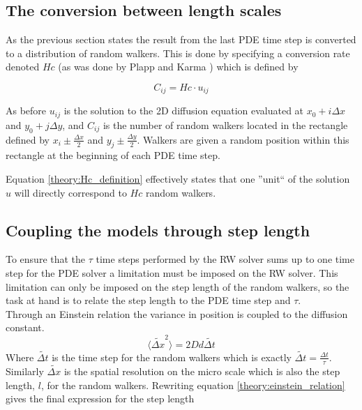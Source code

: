 \subsection{The conversion between length scales}
As the previous section states the result from the last PDE time step is converted to a distribution of random walkers. 
This is done by specifying a conversion rate denoted $Hc$ (as was done by Plapp and Karma \cite{plapp2000multiscale}) which is defined by

\begin{equation}\label{theory:Hc_definition}
 C_{ij} = Hc\cdot u_{ij}
\end{equation}

\noindent As before $u_{ij}$ is the solution to the 2D diffusion equation evaluated at $x_0 +i\Delta x$ and $y_0 +j\Delta y$, and $C_{ij}$ is the number of random walkers located in the rectangle defined by $x_i\pm\frac{\Delta x}{2}$ and $y_j\pm\frac{\Delta y}{2}$. 
Walkers are given a random position within this rectangle at the beginning of each PDE time step. 

Equation \eqref{theory:Hc_definition} effectively states that one ''unit`` of the solution $u$ will directly correspond to $Hc$ random walkers.

\subsection{Coupling the models through step length}

To ensure that the $\tau$ time steps performed by the RW solver sums up to one time step for the PDE solver a limitation must be imposed on the RW solver. 
This limitation can only be imposed on the step length of the random walkers, so the task at hand is to relate the step length to the PDE time step and $\tau$. \\
Through an Einstein relation the variance in position is coupled to the diffusion constant.
\begin{equation}\label{theory:einstein_relation}
 \langle\tilde{\Delta x}^2\rangle = 2Dd\tilde{\Delta t}
\end{equation}
Where $\tilde{\Delta t}$ is the time step for the random walkers which is exactly $\tilde{\Delta t} = \frac{\Delta t}{\tau}$. 
Similarly $\tilde{\Delta x}$ is the spatial resolution on the micro scale which is also the step length, $l$, for the random walkers. 
Rewriting equation \eqref{theory:einstein_relation} gives the final expression for the step length

